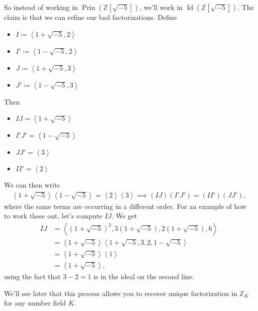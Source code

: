 \begin{remark}

So instead of working in
\(\operatorname{Prin}( {\mathbb{Z}}[\sqrt{-5} ])\), we'll work in
\(\operatorname{Id}({\mathbb{Z}}[\sqrt{-5} ])\). The claim is that we
can refine our bad factorizations. Define

\begin{itemize}
\tightlist
\item
  \(I\coloneqq\left\langle{ 1 + \sqrt{-5} , 2 }\right\rangle\)
\item
  \(I'\coloneqq\left\langle{ 1 - \sqrt{-5} , 2 }\right\rangle\)
\item
  \(J\coloneqq\left\langle{ 1 + \sqrt{-5} , 3 }\right\rangle\)
\item
  \(J'\coloneqq\left\langle{ 1 - \sqrt{-5} , 3 }\right\rangle\)
\end{itemize}

Then

\begin{itemize}
\tightlist
\item
  \(IJ = \left\langle{ 1 + \sqrt{-5} }\right\rangle\)\\
\item
  \(I'J' = \left\langle{ 1 - \sqrt{-5} }\right\rangle\)\\
\item
  \(JJ' = \left\langle{ 3 }\right\rangle\)
\item
  \(II' = \left\langle{ 2 }\right\rangle\)
\end{itemize}

We can then write
\begin{align*}
\left\langle{ 1 + \sqrt{-5} }\right\rangle \left\langle{ 1 - \sqrt{-5} }\right\rangle = \left\langle{ 2 }\right\rangle \left\langle{ 3 }\right\rangle \implies (IJ)(I'J') = (II')(JJ')    
,\end{align*}
where the same terms are occurring in a different order. For an example
of how to work these out, let's compute \(IJ\). We get
\begin{align*}
IJ 
&= \left\langle{ (1 + \sqrt{-5} )^2, 3(1 + \sqrt{-5} ), 2(1 + \sqrt{-5} ), 6 }\right\rangle  \\
&= \left\langle{ 1 + \sqrt{-5} }\right\rangle \left\langle{ 1 + \sqrt{-5} , 3, 2, 1 - \sqrt{-5} }\right\rangle \\  
&= \left\langle{ 1 + \sqrt{-5} }\right\rangle \left\langle{ 1 }\right\rangle  \\
&= \left\langle{ 1 + \sqrt{-5} }\right\rangle
,\end{align*}
using the fact that \(3-2=1\) is in the ideal on the second line.

\hfill\break

We'll see later that this process allows you to recover unique
factorization in \({\mathbb{Z}}_K\) for any number field \(K\).

\end{remark}

